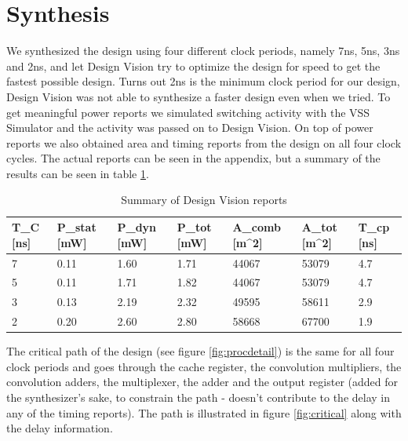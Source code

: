 \documentclass[11pt,a4paper]{article}
\begin{document}
\FloatBarrier
\section{Synthesis}
\label{sec:synthesis}
We synthesized the design using four different clock periods, namely 7ns, 5ns, 3ns and 2ns, and let Design Vision try to optimize the design for speed to get the fastest possible design. Turns out 2ns is the minimum clock period for our design, Design Vision was not able to synthesize a faster design even when we tried. To get meaningful power reports we simulated switching activity with the VSS Simulator and the activity was passed on to Design Vision. On top of power reports we also obtained area and timing reports from the design on all four clock cycles. The actual reports can be seen in the appendix, but a summary of the results can be seen in table \ref{tab:synth}.

\begin{table}[h]
	\caption{Summary of Design Vision reports}
	\begin{center}
		\begin{tabular}{|l|l|l|l|l|l|l|} \hline
			\textbf{T}_{C} [ns]	& \textbf{P}_{stat}	[mW] & \textbf{P}_{dyn} [mW]	& \textbf{P}_{tot} [mW] & \textbf{A}_{comb} [\mu m^2]& \textbf{A}_{tot} [\mu m^2] & \textbf{T}_{cp} [ns] \\ \hline
			7 & 0.11 & 1.60 & 1.71 & 44067 & 53079 & 4.7 \\ \hline
			5 & 0.11 & 1.71 & 1.82 & 44067 & 53079 & 4.7 \\ \hline
			3 & 0.13 & 2.19 & 2.32 & 49595 & 58611 & 2.9 \\ \hline
			2 & 0.20 & 2.60 & 2.80 & 58668 & 67700 & 1.9 \\ \hline
			
		\end{tabular}
	\end{center}
	\label{tab:synth}
\end{table}

The critical path of the design (see figure \ref{fig:procdetail}) is the same for all four clock periods and goes through the cache register, the convolution multipliers, the convolution adders, the multiplexer, the adder and the output register (added for the synthesizer's sake, to constrain the path - doesn't contribute to the delay in any of the timing reports). The path is illustrated in figure \ref{fig:critical} along with the delay information.
\end{document}
